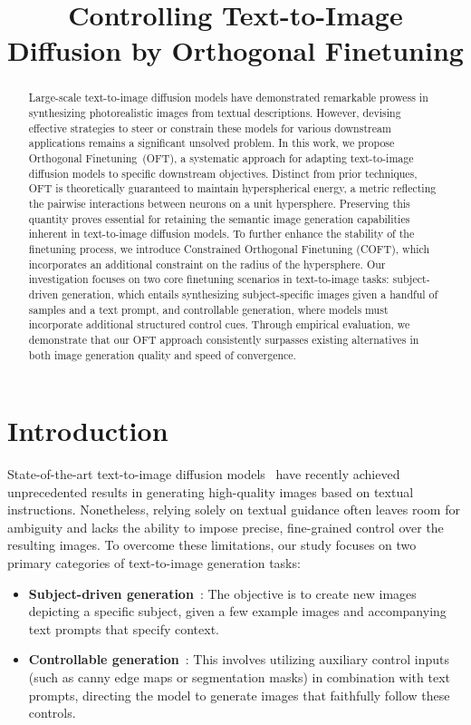 \title{Controlling Text-to-Image Diffusion by Orthogonal Finetuning}

\begin{abstract}
Large-scale text-to-image diffusion models have demonstrated remarkable prowess in synthesizing photorealistic images from textual descriptions. However, devising effective strategies to steer or constrain these models for various downstream applications remains a significant unsolved problem. In this work, we propose Orthogonal Finetuning~(OFT), a systematic approach for adapting text-to-image diffusion models to specific downstream objectives. Distinct from prior techniques, OFT is theoretically guaranteed to maintain hyperspherical energy, a metric reflecting the pairwise interactions between neurons on a unit hypersphere. Preserving this quantity proves essential for retaining the semantic image generation capabilities inherent in text-to-image diffusion models. To further enhance the stability of the finetuning process, we introduce Constrained Orthogonal Finetuning (COFT), which incorporates an additional constraint on the radius of the hypersphere. Our investigation focuses on two core finetuning scenarios in text-to-image tasks: subject-driven generation, which entails synthesizing subject-specific images given a handful of samples and a text prompt, and controllable generation, where models must incorporate additional structured control cues. Through empirical evaluation, we demonstrate that our OFT approach consistently surpasses existing alternatives in both image generation quality and speed of convergence.
\end{abstract}

\section{Introduction}

State-of-the-art text-to-image diffusion models~\cite{saharia2022photorealistic,ramesh2022hierarchical,rombach2022high} have recently achieved unprecedented results in generating high-quality images based on textual instructions. Nonetheless, relying solely on textual guidance often leaves room for ambiguity and lacks the ability to impose precise, fine-grained control over the resulting images. To overcome these limitations, our study focuses on two primary categories of text-to-image generation tasks:

\begin{itemize}[leftmargin=*,nosep]

    \item \textbf{Subject-driven generation}~\cite{ruiz2023dreambooth}: The objective is to create new images depicting a specific subject, given a few example images and accompanying text prompts that specify context.
    \item \textbf{Controllable generation}~\cite{zhang2023adding,mou2023t2i}: This involves utilizing auxiliary control inputs (such as canny edge maps or segmentation masks) in combination with text prompts, directing the model to generate images that faithfully follow these controls.
\end{itemize}

